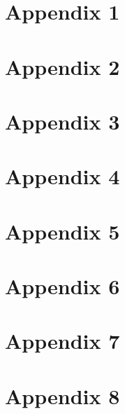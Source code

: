 
\appendix

\chapter{Appendix 1}

\chapter{Appendix 2}

\chapter{Appendix 3}

\chapter{Appendix 4}

\chapter{Appendix 5}

\chapter{Appendix 6}

\chapter{Appendix 7}

\chapter{Appendix 8}

